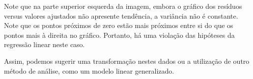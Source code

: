 \documentclass[a4paper,12pt,twoside,printwatermark=true]{modeloLEA}
\numberwithin{equation}{section}
\numberwithin{figure}{section}
\numberwithin{table}{section}
\begin{document}
Note que na parte superior esquerda da imagem, embora o gráfico dos
resíduos versus valores ajustados não apresente tendência, a variância
não é constante. Note que os pontos próximos de zero estão mais próximos
entre si do que os pontos mais à direita no gráfico. Portanto, há uma
violação das hipóteses da regressão linear neste caso.

Assim, podemos sugerir uma transformação nestes dados ou a utilização de
outro método de análise, como um modelo linear generalizado.





\end{document}
